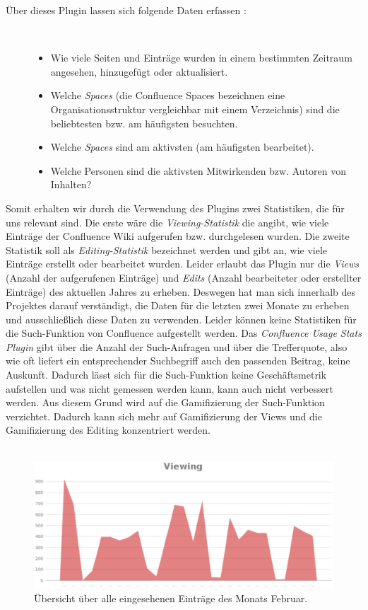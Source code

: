 \documentclass[a4paper,12pt,twoside]{scrartcl}
\begin{document}
\begin{description}
   \item[Über dieses Plugin lassen sich folgende Daten erfassen \cite{Plugin}:]~\par
   \begin{itemize}
      \item Wie viele Seiten und Einträge wurden in einem bestimmten Zeitraum angesehen, hinzugefügt oder aktualisiert. 
      \item Welche \textit{Spaces} \cite{Spaces} (die Confluence Spaces bezeichnen eine Organisationsstruktur vergleichbar mit einem Verzeichnis) sind die beliebtesten bzw. am häufigsten besuchten.
      \item Welche \textit{Spaces} sind am aktivsten (am häufigsten bearbeitet).
      \item Welche Personen sind die aktivsten Mitwirkenden bzw. Autoren von Inhalten? 
   \end{itemize}
\end{description} 
Somit erhalten wir durch die Verwendung des Plugins zwei Statistiken, die für uns relevant sind. Die erste wäre die \textit{Viewing-Statistik} die angibt, wie viele Einträge der Confluence Wiki aufgerufen bzw. durchgelesen wurden. Die zweite Statistik soll als \textit{Editing-Statistik} bezeichnet werden und gibt an, wie viele Einträge erstellt oder bearbeitet wurden. Leider erlaubt das Plugin nur die \textit{Views} (Anzahl der aufgerufenen Einträge) und \textit{Edits} (Anzahl bearbeiteter oder erstellter Einträge) des aktuellen Jahres zu erheben. Deswegen hat man sich innerhalb des Projektes darauf verständigt, die Daten für die letzten zwei Monate zu erheben und ausschließlich diese Daten zu verwenden. Leider können keine Statistiken für die Such-Funktion von Confluence aufgestellt werden. Das \textit{Confluence Usage Stats Plugin} gibt über die Anzahl der Such-Anfragen und über die Trefferquote, also wie oft liefert ein entsprechender Suchbegriff auch den passenden Beitrag, keine Auskunft. Dadurch lässt sich für die Such-Funktion keine Geschäftsmetrik aufstellen und was nicht gemessen werden kann, kann auch nicht verbessert werden. Aus diesem Grund wird auf die Gamifizierung der Such-Funktion verzichtet. Dadurch kann sich mehr auf Gamifizierung der Views und die Gamifizierung des Editing konzentriert werden.   
\\\\
\begin{figure}[h!]
\begin{center}
\includegraphics[scale = 0.6]{Bilder/StatsFebView.eps}
\caption{Übersicht über alle eingesehenen Einträge des Monats Februar.}
\label{StatsFebView}
\end{center}
\end{figure}
\end{document}
